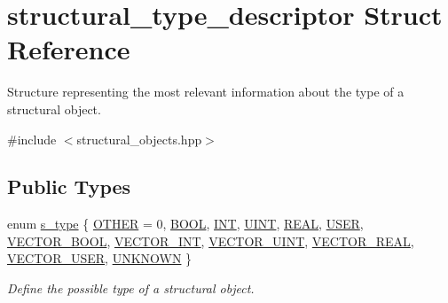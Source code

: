 \hypertarget{structstructural__type__descriptor}{}\section{structural\+\_\+type\+\_\+descriptor Struct Reference}
\label{structstructural__type__descriptor}


Structure representing the most relevant information about the type of a structural object.  




{\ttfamily \#include $<$structural\+\_\+objects.\+hpp$>$}

\subsection*{Public Types}
\begin{DoxyCompactItemize}
\item 
enum \hyperlink{structstructural__type__descriptor_ae12552f84c02a972c2a084901b94cd13}{s\+\_\+type} \{ \newline
\hyperlink{structstructural__type__descriptor_ae12552f84c02a972c2a084901b94cd13a94b50b104b7eecf7b84aa4a7473bfb3a}{O\+T\+H\+ER} = 0, 
\hyperlink{structstructural__type__descriptor_ae12552f84c02a972c2a084901b94cd13ae6d37e94502dfbf26545d529653508db}{B\+O\+OL}, 
\hyperlink{structstructural__type__descriptor_ae12552f84c02a972c2a084901b94cd13a31c7b3475e191bbf29b02383e8b41889}{I\+NT}, 
\hyperlink{structstructural__type__descriptor_ae12552f84c02a972c2a084901b94cd13a5a010ffc1956ff865f2636ad0cca10e2}{U\+I\+NT}, 
\newline
\hyperlink{structstructural__type__descriptor_ae12552f84c02a972c2a084901b94cd13a5fa6a424fdec9916cb73fc22f42a086e}{R\+E\+AL}, 
\hyperlink{structstructural__type__descriptor_ae12552f84c02a972c2a084901b94cd13a9ff88ecd8e1aca46fd6f2ae202762da2}{U\+S\+ER}, 
\hyperlink{structstructural__type__descriptor_ae12552f84c02a972c2a084901b94cd13a410b8856b9dd057b504f5ce48144a457}{V\+E\+C\+T\+O\+R\+\_\+\+B\+O\+OL}, 
\hyperlink{structstructural__type__descriptor_ae12552f84c02a972c2a084901b94cd13ad5a7877b67a5259bd0bba234e9c38d90}{V\+E\+C\+T\+O\+R\+\_\+\+I\+NT}, 
\newline
\hyperlink{structstructural__type__descriptor_ae12552f84c02a972c2a084901b94cd13a0da9c82327380edcdd70cb6a8af5b08f}{V\+E\+C\+T\+O\+R\+\_\+\+U\+I\+NT}, 
\hyperlink{structstructural__type__descriptor_ae12552f84c02a972c2a084901b94cd13afa8e18bc909fd4948c8aaf657b33bee0}{V\+E\+C\+T\+O\+R\+\_\+\+R\+E\+AL}, 
\hyperlink{structstructural__type__descriptor_ae12552f84c02a972c2a084901b94cd13a6e242fb800b323fe3be5c820dbc5ad50}{V\+E\+C\+T\+O\+R\+\_\+\+U\+S\+ER}, 
\hyperlink{structstructural__type__descriptor_ae12552f84c02a972c2a084901b94cd13a883e07763edc58a973ece06d2dc4df25}{U\+N\+K\+N\+O\+WN}
 \}\begin{DoxyCompactList}\small\item\em Define the possible type of a structural object. \end{DoxyCompactList}
\end{DoxyCompactItemize}
